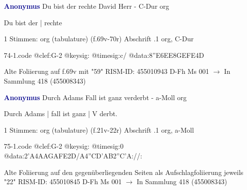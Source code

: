 \documentclass[twocolumn]{book}
\begin{document}
\newline \par \vspace{7pt} \textcolor{darkblue}{\textbf{Anonymus  }}
\newline Du bist der rechte David Herr - C-Dur
\newline org
\newline \begin{itshape}[f.69v, at left:] Du bist der | rechte\end{itshape} 
\newline \textcolor{darkblue}{}  1 Stimmen: org (tabulature)  (f.69v-70r)
\newline Abschrift
.1  org, C-Dur  
\begin{filecontents*}{74-1.code}
@clef:G-2
@keysig:
@timesig:c/
@data:{8''E6EE8GE}{FE}4D
\end{filecontents*}
\newline
%
\newline Alte Foliierung auf f.69v mit "59"
\newline RISM-ID: 455010943
\newline D-Fh  Ms 001
\newline $\rightarrow$ In Sammlung 418 (455008343)
      
\newline \par \vspace{7pt} \textcolor{darkblue}{\textbf{Anonymus  }}
\newline Durch Adams Fall ist ganz verderbt - a-Moll
\newline org
\newline \begin{itshape}[f.21v, at left:] Durch Adams | fall ist ganz | V derbt.\end{itshape} 
\newline \textcolor{darkblue}{}  1 Stimmen: org (tabulature)  (f.21v-22r)
\newline Abschrift
.1  org, a-Moll  
\begin{filecontents*}{75-1.code}
@clef:G-2
@keysig:
@timesig:0
@data:2'A4AAGAFE2D/A4''CD'AB2''C'A://:
\end{filecontents*}
\newline
%
\newline Alte Foliierung auf den gegenüberliegenden Seiten als Aufschlagfoliierung jeweils "22"
\newline RISM-ID: 455010845
\newline D-Fh  Ms 001
\newline $\rightarrow$ In Sammlung 418 (455008343)
      
\end{document}
